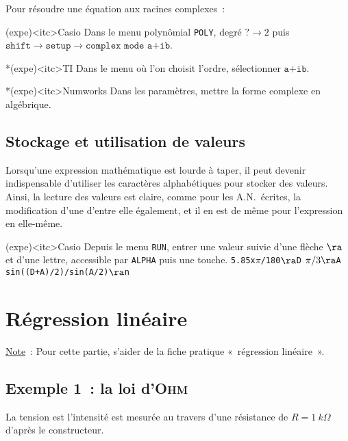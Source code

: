 \documentclass[../main/main.tex]{subfiles}
\begin{document}
Pour résoudre une équation aux racines complexes~:

\begin{tcbraster}[raster columns=3, raster equal height=rows]
	\begin{tcb}(expe)<itc>{Casio}
		Dans le menu polynômial \texttt{POLY}, degré $? \rightarrow
			2$ puis $\texttt{shift} \rightarrow \texttt{setup} \rightarrow
			\texttt{complex mode a+ib}$.
	\end{tcb}
	\begin{tcb}*(expe)<itc>{TI}
		Dans le menu où l'on choisit l'ordre, sélectionner $\texttt{a+ib}$.
	\end{tcb}
	\begin{tcb}*(expe)<itc>{Numworks}
		Dans les paramètres, mettre la forme complexe en algébrique.
	\end{tcb}
\end{tcbraster}

\subsection{Stockage et utilisation de valeurs}
Lorsqu'une expression mathématique est lourde à taper, il peut devenir
indispensable d'utiliser les caractères alphabétiques pour stocker des valeurs.
Ainsi, la lecture des valeurs est claire, comme pour les A.N.\ écrites, la
modification d'une d'entre elle également, et il en est de même pour
l'expression en elle-même.

\begin{tcb}[sidebyside](expe)<itc>{Casio}
  Depuis le menu \texttt{RUN}, entrer une valeur suivie d'une flèche $\ra$ et
  d'une lettre, accessible par \texttt{ALPHA} puis une touche.
  \tcblower
  \texttt{\num{5.85}x$\pi$/180$\ra$D}
  \smallbreak
  \texttt{$\pi/3\ra$A}
  \smallbreak
  \texttt{sin((D+A)/2)/sin(A/2)$\ra$n}
\end{tcb}

\section{Régression linéaire}

\underline{Note}~: Pour cette partie, s'aider de la fiche pratique «~régression
linéaire~».

\subsection{Exemple 1~: la loi d'\textsc{Ohm}}

La tension est l'intensité est mesurée au travers d'une résistance de $R=
	\SI{1}{k\Omega}$ d'après le constructeur.
\end{document}
